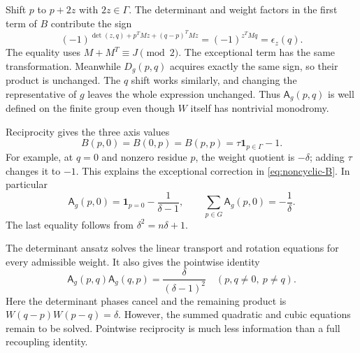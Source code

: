 \begin{example}
Shift $p$ to $p+2z$ with $2z\in\Gamma$. The determinant and
weight factors in the first term of $B$ contribute the sign
\[
 (-1)^{\det(z,q)+p^TMz+(q-p)^TMz}
 =(-1)^{z^TMq}=\epsilon_z(q).
\]
The equality uses $M+M^T\equiv J\pmod2$. The exceptional term
has the same transformation. Meanwhile $D_g(p,q)$ acquires
exactly the same sign, so their product is unchanged. The $q$
shift works similarly, and changing the representative of $g$
leaves the whole expression unchanged. Thus $\mathsf A_g(p,q)$
is well defined on the finite group even though $W$ itself has
nontrivial monodromy.
\end{example}

Reciprocity gives the three axis values
\[
 B(p,0)=B(0,p)=B(p,p)=\tau\mathbf1_{p\in\Gamma}-1.
\]
For example, at $q=0$ and nonzero residue $p$, the weight quotient
is $-\delta$; adding $\tau$ changes it to $-1$. This explains
the exceptional correction in \eqref{eq:noncyclic-B}. In particular
\begin{equation}
 \mathsf A_g(p,0)=\mathbf1_{p=0}-\frac1{\delta-1},\qquad
 \sum_{p\in G}\mathsf A_g(p,0)=-\frac1\delta.
 \label{eq:noncyclic-axis}
\end{equation}
The last equality follows from $\delta^2=n\delta+1$.

The determinant ansatz solves the linear transport and rotation
equations for every admissible weight. It also gives the pointwise
identity
\begin{equation}
 \mathsf A_g(p,q)\mathsf A_g(q,p)
 =\frac{\delta}{(\delta-1)^2}
 \quad(p,q\ne0,\ p\ne q).
 \label{eq:noncyclic-pair}
\end{equation}
Here the determinant phases cancel and the remaining product is
$W(q-p)W(p-q)=\delta$. However, the summed quadratic and cubic
equations remain to be solved. Pointwise reciprocity is much less
information than a full recoupling identity.

